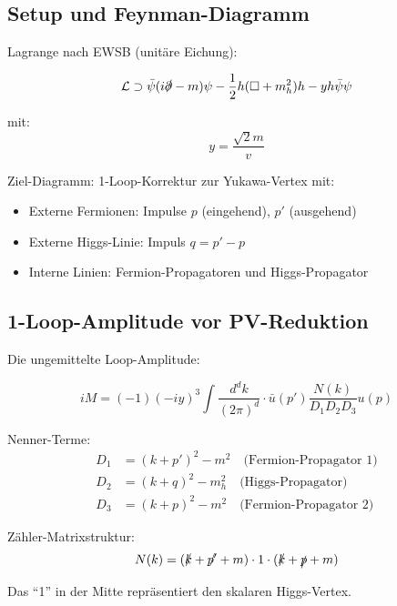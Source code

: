 \documentclass[12pt,a4paper]{article}
\theoremstyle{definition}
\begin{document}
	\subsection{Setup und Feynman-Diagramm}
	
	Lagrange nach EWSB (unitäre Eichung):
	
	\begin{equation}
		\mathcal{L} \supset \bar{\psi}(i\slashed{\partial} - m)\psi - \frac{1}{2}h(\Box + m_h^2)h - y h \bar{\psi}\psi
	\end{equation}
	
	mit:
	\begin{equation}
		y = \frac{\sqrt{2} m}{v}
	\end{equation}
	
	Ziel-Diagramm: 1-Loop-Korrektur zur Yukawa-Vertex mit:
	\begin{itemize}
		\item Externe Fermionen: Impulse $p$ (eingehend), $p'$ (ausgehend)
		\item Externe Higgs-Linie: Impuls $q = p' - p$
		\item Interne Linien: Fermion-Propagatoren und Higgs-Propagator
	\end{itemize}
	
	\subsection{1-Loop-Amplitude vor PV-Reduktion}
	
	Die ungemittelte Loop-Amplitude:
	
	\begin{equation}
		iM = (-1)(-iy)^3 \int \frac{d^d k}{(2\pi)^d} \cdot \bar{u}(p') \frac{N(k)}{D_1 D_2 D_3} u(p)
	\end{equation}
	
	Nenner-Terme:
	\begin{align}
		D_1 &= (k + p')^2 - m^2 \quad \text{(Fermion-Propagator 1)}\\
		D_2 &= (k + q)^2 - m_h^2 \quad \text{(Higgs-Propagator)}\\
		D_3 &= (k + p)^2 - m^2 \quad \text{(Fermion-Propagator 2)}
	\end{align}
	
	Zähler-Matrixstruktur:
	\begin{equation}
		N(k) = (\slashed{k} + \slashed{p'} + m) \cdot 1 \cdot (\slashed{k} + \slashed{p} + m)
	\end{equation}
	
	Das ``1'' in der Mitte repräsentiert den skalaren Higgs-Vertex.
	
\end{document}
